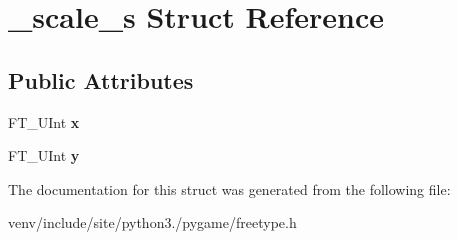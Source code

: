 \hypertarget{struct__scale__s}{}\section{\+\_\+scale\+\_\+s Struct Reference}
\label{struct__scale__s}
\subsection*{Public Attributes}
\begin{DoxyCompactItemize}
\item 
\mbox{\label{struct__scale__s_a739aeecb4bc54ee9c4398bd299e5ff0c}} 
F\+T\+\_\+\+U\+Int {\bfseries x}
\item 
\mbox{\label{struct__scale__s_a4d80449f552e511ebce8cf3148413173}} 
F\+T\+\_\+\+U\+Int {\bfseries y}
\end{DoxyCompactItemize}


The documentation for this struct was generated from the following file\+:\begin{DoxyCompactItemize}
\item 
venv/include/site/python3./pygame/freetype.\+h\end{DoxyCompactItemize}
